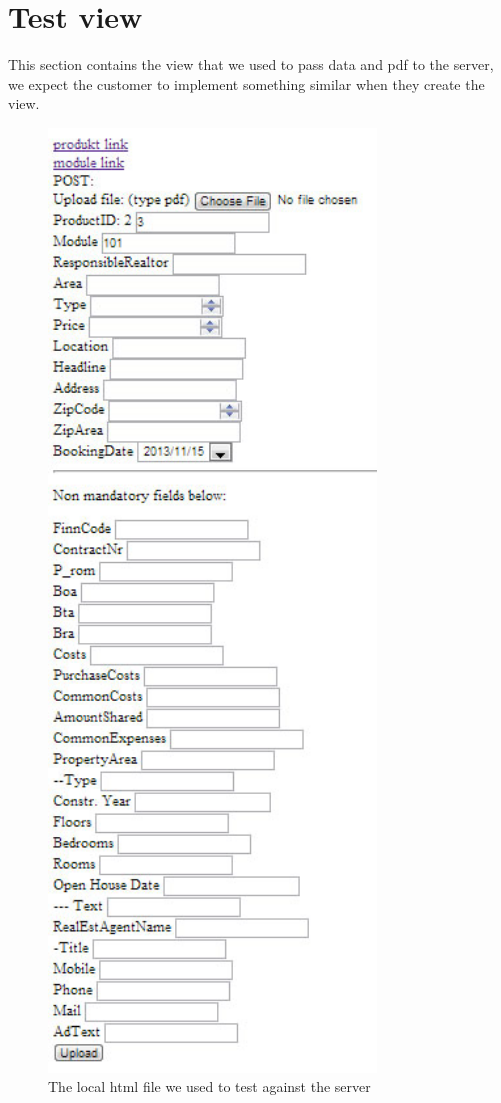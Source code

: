 
\chapter{Test view}
This section contains the view that we used to pass data and pdf to the server, we expect the customer to implement something similar when they create the view.
\begin{center}
\begin{figure}
\includegraphics[height = 25cm]{images/localTest.jpg}
\caption{The local html file we used to test against the server}
\end{figure}
\end{center}
